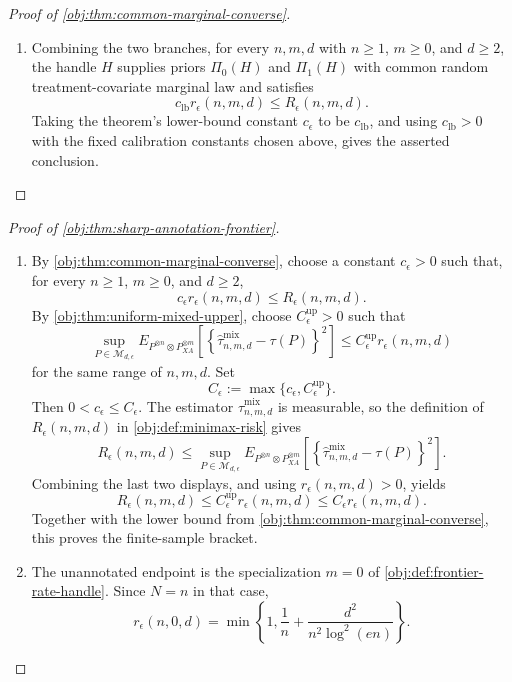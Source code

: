 \documentclass[11pt]{article}
\begin{document}
\begin{proof}[Proof of \cref{obj:thm:common-marginal-converse}]
\begin{enumerate}
\item Combining the two branches, for every \(n,m,d\) with \(n\ge1\), \(m\ge0\), and \(d\ge2\), the handle \(H\) supplies priors \(\Pi_0(H)\) and \(\Pi_1(H)\) with common random treatment-covariate marginal law and satisfies
\[
c_{\mathrm{lb}} r_\epsilon(n,m,d)\le R_\epsilon(n,m,d).
\]
Taking the theorem's lower-bound constant \(c_\epsilon\) to be \(c_{\mathrm{lb}}\), and using \(c_{\mathrm{lb}}>0\) with the fixed calibration constants chosen above, gives the asserted conclusion. %
\end{enumerate}
\end{proof}

\begin{proof}[Proof of \cref{obj:thm:sharp-annotation-frontier}]
\begin{enumerate}
\item By \cref{obj:thm:common-marginal-converse}, choose a constant \(c_\epsilon>0\) such that, for every \(n\ge1\), \(m\ge0\), and \(d\ge2\),
\[
c_\epsilon r_\epsilon(n,m,d)\le R_\epsilon(n,m,d).
\]
By \cref{obj:thm:uniform-mixed-upper}, choose \(C_\epsilon^{\mathrm{up}}>0\) such that
\[
\sup_{P\in\mathcal M_{d,\epsilon}}
E_{P^{\otimes n}\otimes P_{XA}^{\otimes m}}
\!\left[
\left\{\widehat\tau^{\mathrm{mix}}_{n,m,d}-\tau(P)\right\}^2
\right]
\le
C_\epsilon^{\mathrm{up}} r_\epsilon(n,m,d)
\]
for the same range of \(n,m,d\).  Set
\[
C_\epsilon:=\max\{c_\epsilon,C_\epsilon^{\mathrm{up}}\}.
\]
Then \(0<c_\epsilon\le C_\epsilon\).  The estimator
\(\widehat\tau^{\mathrm{mix}}_{n,m,d}\) is measurable, so the definition of
\(R_\epsilon(n,m,d)\) in \cref{obj:def:minimax-risk} gives
\[
R_\epsilon(n,m,d)
\le
\sup_{P\in\mathcal M_{d,\epsilon}}
E_{P^{\otimes n}\otimes P_{XA}^{\otimes m}}
\!\left[
\left\{\widehat\tau^{\mathrm{mix}}_{n,m,d}-\tau(P)\right\}^2
\right].
\]
Combining the last two displays, and using \(r_\epsilon(n,m,d)>0\), yields
\[
R_\epsilon(n,m,d)
\le
C_\epsilon^{\mathrm{up}} r_\epsilon(n,m,d)
\le
C_\epsilon r_\epsilon(n,m,d).
\]
Together with the lower bound from \cref{obj:thm:common-marginal-converse}, this proves the finite-sample bracket. %

\item The unannotated endpoint is the specialization \(m=0\) of \cref{obj:def:frontier-rate-handle}.  Since \(N=n\) in that case,
\[
r_\epsilon(n,0,d)
=
\min\!\left\{1,\frac1n+\frac{d^2}{n^2\log^2(en)}\right\}.
\]


\end{enumerate}
\end{proof}
\end{document}
